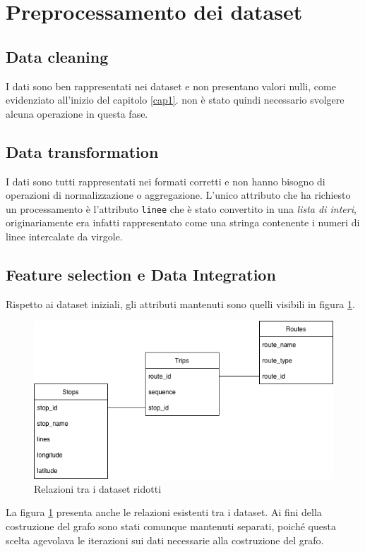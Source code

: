 \section{Preprocessamento dei dataset}

\subsection{Data cleaning}
I dati sono ben rappresentati nei dataset e non presentano valori nulli, come evidenziato all'inizio del capitolo \ref{cap1}. non è stato quindi necessario svolgere alcuna operazione in questa fase.

\subsection{Data transformation}
I dati sono tutti rappresentati nei formati corretti e non hanno bisogno di operazioni di normalizzazione o aggregazione. L'unico attributo che ha richiesto un processamento è l'attributo \texttt{linee} che è stato convertito in una \textit{lista di interi}, originariamente era infatti rappresentato come una stringa contenente i numeri di linee intercalate da virgole.

\subsection{Feature selection e Data Integration}

Rispetto ai dataset iniziali, gli attributi mantenuti sono quelli visibili in figura \ref{fig:data integration}.

\vspace{1em}
\begin{figure}[h!]
    \centering
    \includegraphics[width=0.7\linewidth]{Immagini/Capitoli/cap1/data_integration.png}
    \caption{Relazioni tra i dataset ridotti}
    \label{fig:data integration}
\end{figure}
\vspace{1em}

La figura \ref{fig:data integration} presenta anche le relazioni esistenti tra i dataset. Ai fini della costruzione del grafo sono stati comunque mantenuti separati, poiché questa scelta agevolava le iterazioni sui dati necessarie alla costruzione del grafo.